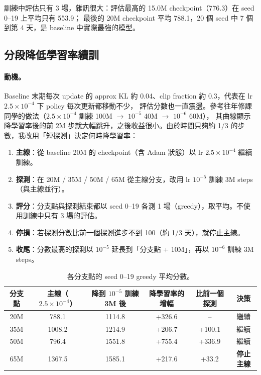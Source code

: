 \documentclass[11pt,a4paper]{article}
\begin{document}
訓練中評估只有 3 場，雜訊很大：評估最高的 15.0M checkpoint（776.3）在 seed 0--19 上平均只有 553.9；
最後的 20M checkpoint 平均 788.1，20 個 seed 中 7 個到第 4 天，是 baseline 中實際最強的模型。

\subsection{分段降低學習率續訓}
\label{sec:lr}
\paragraph{動機。}
Baseline 末期每次 update 的 approx KL 約 0.04、clip fraction 約 0.3，代表在 lr $2.5\times10^{-4}$ 下 policy 每次更新都移動不少，
評估分數也一直震盪。參考往年修課同學的做法（$2.5\times10^{-4}$ 訓練 100M $\rightarrow$ $10^{-5}$ 40M $\rightarrow$ $10^{-6}$ 60M），
其曲線顯示降學習率後的前 2M 步就大幅跳升，之後收益很小。由於時間只夠約 1/3 的步數，我改用「短探測」決定何時降學習率：

\begin{enumerate}[leftmargin=1.5em]
  \item \textbf{主線}：從 baseline 20M 的 checkpoint（含 Adam 狀態）以 lr $2.5\times10^{-4}$ 繼續訓練。
  \item \textbf{探測}：在 20M / 35M / 50M / 65M 從主線分支，改用 lr $10^{-5}$ 訓練 3M steps（與主線並行）。
  \item \textbf{評分}：分支點與探測結束都以 seed 0--19 各測 1 場（greedy），取平均。不使用訓練中只有 3 場的評估。
  \item \textbf{停損}：若探測分數比前一個探測進步不到 100（約 1/3 天），就停止主線。
  \item \textbf{收尾}：分數最高的探測以 $10^{-5}$ 延長到「分支點 + 10M」，再以 $10^{-6}$ 訓練 3M steps。
\end{enumerate}

\begin{table}[H]
\centering\small
\begin{tabular}{cccccc}
\toprule
分支點 & 主線（$2.5\times10^{-4}$） & 降到 $10^{-5}$ 訓練 3M 後 & 降學習率的增幅 & 比前一個探測 & 決策 \\
\midrule
20M & 788.1 & 1114.8 & +326.6 & -- & 繼續 \\
35M & 1008.2 & 1214.9 & +206.7 & +100.1 & 繼續 \\
50M & 796.4 & 1551.8 & +755.4 & +336.9 & 繼續 \\
65M & 1367.5 & 1585.1 & +217.6 & +33.2 & \textbf{停止主線} \\
\bottomrule
\end{tabular}
\caption{各分支點的 seed 0--19 greedy 平均分數。}
\label{tab:probe}
\end{table}
\end{document}
